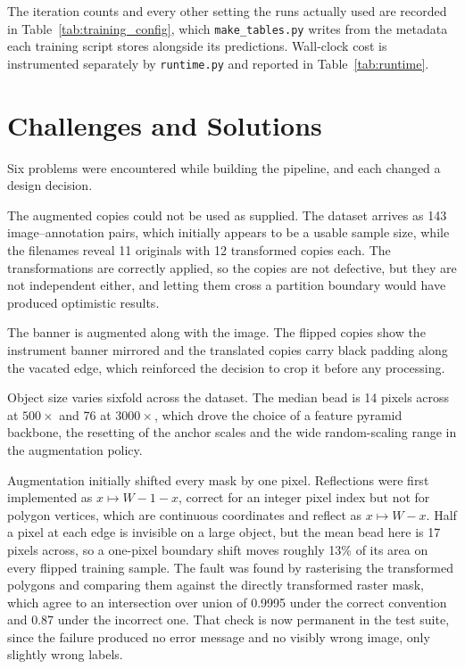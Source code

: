 The iteration counts and every other setting the runs actually used are recorded
in Table~\ref{tab:training_config}, which \texttt{make\_tables.py} writes from the
metadata each training script stores alongside its predictions. Wall-clock cost is
instrumented separately by \texttt{runtime.py} and reported in
Table~\ref{tab:runtime}.

\section{Challenges and Solutions}
\label{sec:challenges}

Six problems were encountered while building the pipeline, and each changed a
design decision.

The augmented copies could not be used as supplied. The dataset arrives
as 143 image--annotation pairs, which initially appears to be a usable sample
size, while the filenames reveal 11 originals with 12 transformed copies each.
The transformations are correctly applied, so the copies are not defective, but
they are not independent either, and letting them cross a partition boundary would
have produced optimistic results.

The banner is augmented along with the image. The flipped copies show the
instrument banner mirrored and the translated copies carry black padding along the
vacated edge, which reinforced the decision to crop it before any processing.

Object size varies sixfold across the dataset. The median bead is 14
pixels across at $500\times$ and 76 at $3000\times$, which drove the choice of a
feature pyramid backbone, the resetting of the anchor scales and the wide
random-scaling range in the augmentation policy.

Augmentation initially shifted every mask by one pixel. Reflections were
first implemented as $x \mapsto W - 1 - x$, correct for an integer pixel index but
not for polygon vertices, which are continuous coordinates and reflect as
$x \mapsto W - x$. Half a pixel at each edge is invisible on a large object, but
the mean bead here is 17 pixels across, so a one-pixel boundary shift moves
roughly 13\% of its area on every flipped training sample. The fault was found by
rasterising the transformed polygons and comparing them against the directly
transformed raster mask, which agree to an intersection over union of 0.9995 under
the correct convention and 0.87 under the incorrect one. That check is now
permanent in the test suite, since the failure produced no error message and no
visibly wrong image, only slightly wrong labels.

